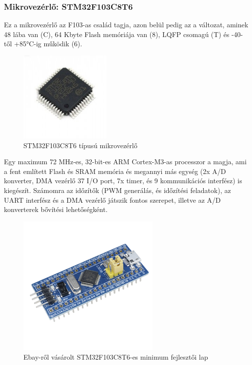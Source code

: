 \documentclass[../main.tex]{subfiles}
\begin{document}
        \subsubsection{Mikrovezérlő: STM32F103C8T6}
            Ez a mikrovezérlő az F103-as család tagja, azon belül pedig az a változat, aminek 48 lába van (C), 64 Kbyte Flash memóriája van (8), LQFP csomagú (T) és -40-től +85°C-ig működik (6). \cite{ds_stm32}
            
            \begin{figure}[h!]
                \centering
                    \includegraphics[width=4.5cm]{resources/pcb_res/stm32f103c8t6.jpg}
                \caption{STM32F103C8T6 típusú mikrovezérlő\cite{sec_204}}
                \label{fig:stm32f103_ic}
            \end{figure}
            
            Egy maximum 72 MHz-es, 32-bit-es ARM Cortex-M3-as processzor a magja, ami a fent említett Flash és SRAM memória és megannyi más egység (2x A/D konverter, DMA vezérlő 37 I/O port, 7x timer, és 9 kommunikációs interfész) is kiegészít. Számomra az időzítők (PWM generálás, és időzítési feladatok), az UART interfész és a DMA vezérlő játszik fontos szerepet, illetve az A/D konverterek bővítési lehetőségként.
            
            \begin{figure}[h!]
                \centering
                    \includegraphics[width=7cm]{resources/pcb_res/stm32f103c8t6_minimum_dev_board.jpg}
                \caption{Ebay-ről vásárolt STM32F103C8T6-es minimum fejlesztői lap\cite{sec_205}}
                \label{fig:stm32f103_dev_board}
            \end{figure}

\newpage
\end{document}
